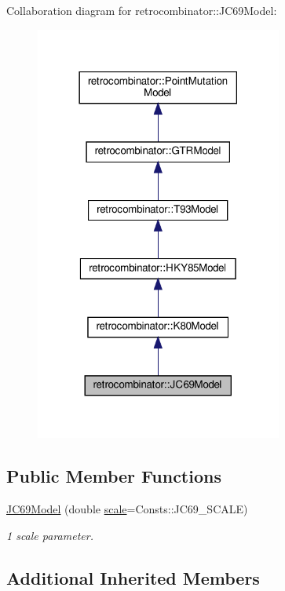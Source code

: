 Collaboration diagram for retrocombinator\+:\+:J\+C69\+Model\+:\nopagebreak
\begin{figure}[H]
\begin{center}
\leavevmode
\includegraphics[width=230pt]{classretrocombinator_1_1JC69Model__coll__graph}
\end{center}
\end{figure}
\subsection*{Public Member Functions}
\begin{DoxyCompactItemize}
\item 
\hyperlink{classretrocombinator_1_1JC69Model_ab28021c22ed997738e2eac2f280930a5}{J\+C69\+Model} (double \hyperlink{classretrocombinator_1_1PointMutationModel_a3258dfbdae0f2614cdc66f13ae028b46}{scale}=Consts\+::\+J\+C69\+\_\+\+S\+C\+A\+LE)
\begin{DoxyCompactList}\small\item\em 1 scale parameter. \end{DoxyCompactList}\end{DoxyCompactItemize}
\subsection*{Additional Inherited Members}


